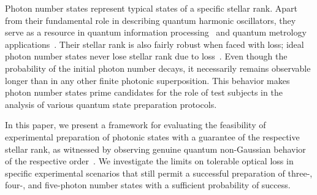 \documentclass{article}
\begin{document}
Photon number states represent typical states of a specific stellar rank. Apart from their fundamental role in describing quantum harmonic oscillators, they serve as a resource in quantum information processing~\cite{marek2009} and quantum metrology applications~\cite{kunitski2019,oh2020}. Their stellar rank is also fairly robust when faced with loss; ideal photon number states never lose stellar rank due to loss~\cite{lachman2019}. Even though the probability of the initial photon number decays, it necessarily remains observable longer than in any other finite photonic superposition. This behavior makes photon number states prime candidates for the role of test subjects in the analysis of various quantum state preparation protocols.

In this paper, we present a framework for evaluating the feasibility of experimental preparation of photonic states with a guarantee of the respective stellar rank, as witnessed by observing genuine quantum non-Gaussian behavior of the respective order~\cite{lachman2019}. We investigate the limits on tolerable optical loss in specific experimental scenarios that still permit a successful preparation of three-, four-, and five-photon number states with a sufficient probability of success.

% 
% 
 
\end{document}
